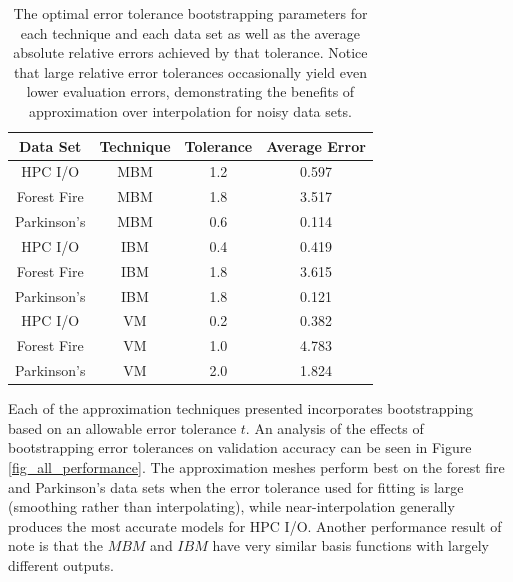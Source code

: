 \documentclass[smallextended]{svjour3}       %
\begin{document}
\begin{table}
  \centering
  \begin{tabular}{c|c|c|c}
    \hline
    \textbf{Data Set} & \textbf{Technique} & \textbf{Tolerance} & \textbf{Average Error}\\
    \hline
    HPC I/O & MBM & 1.2 & 0.597\\
    Forest Fire & MBM & 1.8 & 3.517\\
    Parkinson's & MBM & 0.6 & 0.114\\
    \hline
    HPC I/O & IBM & 0.4 & 0.419\\
    Forest Fire & IBM & 1.8 & 3.615\\
    Parkinson's & IBM & 1.8 & 0.121\\
    \hline
    HPC I/O & VM & 0.2 & 0.382\\
    Forest Fire & VM & 1.0 & 4.783\\
    Parkinson's & VM & 2.0 & 1.824\\
    \hline
  \end{tabular}
  \caption{The optimal error tolerance bootstrapping parameters for each technique and each data set as well as the average absolute relative errors achieved by that tolerance. Notice that large relative error tolerances occasionally yield even lower evaluation errors, demonstrating the benefits of approximation over interpolation for noisy data sets.
  \vspace{-.5cm}}
  \label{tab_optimal_tolerance}
\end{table}

Each of the approximation techniques presented incorporates bootstrapping based on an allowable error tolerance $t$. An analysis of the effects of bootstrapping error tolerances on validation accuracy can be seen in Figure \ref{fig_all_performance}. The approximation meshes perform best on the forest fire and Parkinson's data sets when the error tolerance used for fitting is large (smoothing rather than interpolating), while near-interpolation generally produces the most accurate models for HPC I/O. Another performance result of note is that the $MBM$ and $IBM$ have very similar basis functions with largely different outputs.
\end{document}
